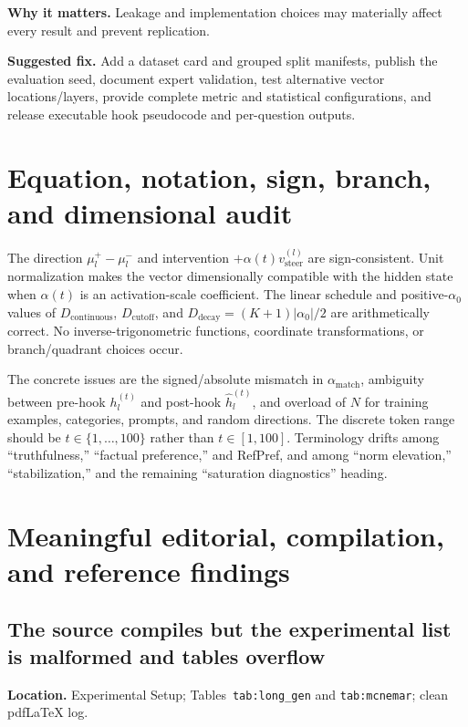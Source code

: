 \documentclass[11pt]{article}
\newcommand{\findinglabel}[1]{\textbf{#1}}
\begin{document}
\findinglabel{Why it matters.} Leakage and implementation choices may materially affect every result and prevent replication.

\findinglabel{Suggested fix.} Add a dataset card and grouped split manifests, publish the evaluation seed, document expert validation, test alternative vector locations/layers, provide complete metric and statistical configurations, and release executable hook pseudocode and per-question outputs.

\section*{Equation, notation, sign, branch, and dimensional audit}

The direction $\mu_l^+-\mu_l^-$ and intervention $+\alpha(t)v_{\text{steer}}^{(l)}$ are sign-consistent.  Unit normalization makes the vector dimensionally compatible with the hidden state when $\alpha(t)$ is an activation-scale coefficient.  The linear schedule and positive-$\alpha_0$ values of $D_{\text{continuous}}$, $D_{\text{cutoff}}$, and $D_{\text{decay}}=(K+1)|\alpha_0|/2$ are arithmetically correct.  No inverse-trigonometric functions, coordinate transformations, or branch/quadrant choices occur.

The concrete issues are the signed/absolute mismatch in $\alpha_{\text{match}}$, ambiguity between pre-hook $h_l^{(t)}$ and post-hook $\hat h_l^{(t)}$, and overload of $N$ for training examples, categories, prompts, and random directions.  The discrete token range should be $t\in\{1,\ldots,100\}$ rather than $t\in[1,100]$.  Terminology drifts among ``truthfulness,'' ``factual preference,'' and RefPref, and among ``norm elevation,'' ``stabilization,'' and the remaining ``saturation diagnostics'' heading.

\section*{Meaningful editorial, compilation, and reference findings}

\subsection*{The source compiles but the experimental list is malformed and tables overflow}

\findinglabel{Location.} Experimental Setup; Tables~\texttt{tab:long\_gen} and \texttt{tab:mcnemar}; clean pdfLaTeX log.
\end{document}
